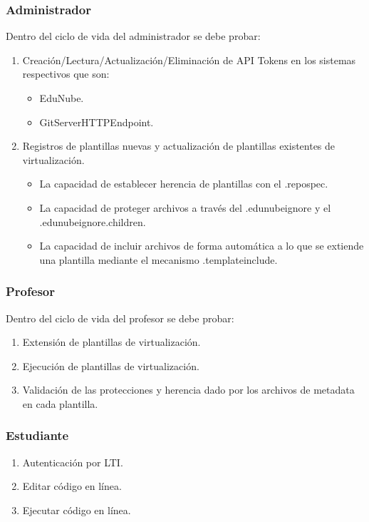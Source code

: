 \subsubsection{Administrador}
Dentro del ciclo de vida del administrador se debe probar:
\begin{enumerate}
  \item Creación/Lectura/Actualización/Eliminación de API Tokens en los sistemas respectivos que son:
  \begin{itemize}
    \item EduNube.
    \item GitServerHTTPEndpoint.
  \end{itemize}
  \item Registros de plantillas nuevas y actualización de plantillas existentes de virtualización.
  \begin{itemize}
    \item La capacidad de establecer herencia de plantillas con el .repospec.
    \item La capacidad de proteger archivos a través del  .edunubeignore y el .edunubeignore.children.
    \item La capacidad de incluir archivos de forma automática a lo que se extiende una plantilla mediante el mecanismo .templateinclude.
  \end{itemize}
\end{enumerate}

\subsubsection{Profesor}
Dentro del ciclo de vida del profesor se debe probar:
\begin{enumerate}
  \item Extensión de plantillas de virtualización.
  \item Ejecución de plantillas de virtualización.
  \item Validación de las protecciones y herencia dado por los archivos de metadata en cada plantilla.
\end{enumerate}

\subsubsection{Estudiante}
\begin{enumerate}
  \item Autenticación por LTI.
  \item Editar código en línea.
  \item Ejecutar código en línea.
\end{enumerate}


